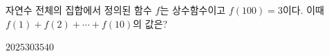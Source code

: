 \hspace*{2mm}\begin{minipage}[t]{\dimexpr\linewidth-2mm\relax}\vspace{0pt}
자연수 전체의 집합에서 정의된 함수 $f$는 상수함수이고 $f(100)=3$이다. 이때 $f(1)+f(2)+\cdots+f(10)$의 값은?
\begin{choices32}{$20$}{$25$}{$30$}{$35$}{$40$}\end{choices32}\end{minipage}
